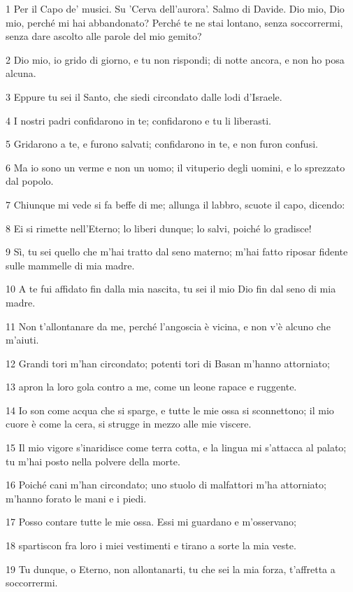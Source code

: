 \par 1 Per il Capo de' musici. Su 'Cerva dell'aurora'. Salmo di Davide. Dio mio, Dio mio, perché mi hai abbandonato? Perché te ne stai lontano, senza soccorrermi, senza dare ascolto alle parole del mio gemito?
\par 2 Dio mio, io grido di giorno, e tu non rispondi; di notte ancora, e non ho posa alcuna.
\par 3 Eppure tu sei il Santo, che siedi circondato dalle lodi d'Israele.
\par 4 I nostri padri confidarono in te; confidarono e tu li liberasti.
\par 5 Gridarono a te, e furono salvati; confidarono in te, e non furon confusi.
\par 6 Ma io sono un verme e non un uomo; il vituperio degli uomini, e lo sprezzato dal popolo.
\par 7 Chiunque mi vede si fa beffe di me; allunga il labbro, scuote il capo, dicendo:
\par 8 Ei si rimette nell'Eterno; lo liberi dunque; lo salvi, poiché lo gradisce!
\par 9 Sì, tu sei quello che m'hai tratto dal seno materno; m'hai fatto riposar fidente sulle mammelle di mia madre.
\par 10 A te fui affidato fin dalla mia nascita, tu sei il mio Dio fin dal seno di mia madre.
\par 11 Non t'allontanare da me, perché l'angoscia è vicina, e non v'è alcuno che m'aiuti.
\par 12 Grandi tori m'han circondato; potenti tori di Basan m'hanno attorniato;
\par 13 apron la loro gola contro a me, come un leone rapace e ruggente.
\par 14 Io son come acqua che si sparge, e tutte le mie ossa si sconnettono; il mio cuore è come la cera, si strugge in mezzo alle mie viscere.
\par 15 Il mio vigore s'inaridisce come terra cotta, e la lingua mi s'attacca al palato; tu m'hai posto nella polvere della morte.
\par 16 Poiché cani m'han circondato; uno stuolo di malfattori m'ha attorniato; m'hanno forato le mani e i piedi.
\par 17 Posso contare tutte le mie ossa. Essi mi guardano e m'osservano;
\par 18 spartiscon fra loro i miei vestimenti e tirano a sorte la mia veste.
\par 19 Tu dunque, o Eterno, non allontanarti, tu che sei la mia forza, t'affretta a soccorrermi.
